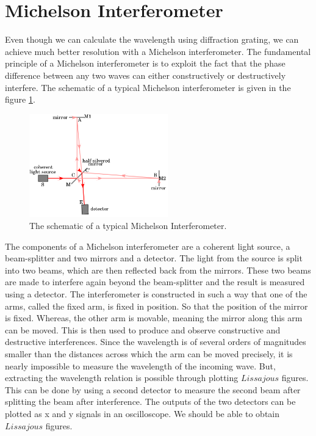 \section{Michelson Interferometer}
Even though we can calculate the wavelength using diffraction grating, we can achieve much better resolution with a Michelson interferometer. The fundamental principle of a Michelson interferometer is to exploit the fact that the phase difference between any two waves can either constructively or destructively interfere. The schematic of a typical Michelson interferometer is given in the figure \ref{fig:michelson}.\\
\begin{figure}[h!]
    \centering
    \includegraphics[width = 6cm]{michelson.png}
    \caption{The schematic of a typical Michelson Interferometer\cite{michelson}.}
    \label{fig:michelson}
\end{figure}
The components of a Michelson interferometer are a coherent light source, a beam-splitter and two mirrors and a detector. The light from the source is split into two beams, which are then reflected back from the mirrors. These two beams are made to interfere again beyond the beam-splitter and the result is measured using a detector. The interferometer is constructed in such a way that one of the arms, called the fixed arm, is fixed in position. So that the position of the mirror is fixed. Whereas, the other arm is movable, meaning the mirror along this arm can be moved. This is then used to produce and observe constructive and destructive interferences. Since the wavelength is of several orders of magnitudes smaller than the distances across which the arm can be moved precisely, it is nearly impossible to measure the wavelength of the incoming wave. But, extracting the wavelength relation is possible through plotting $Lissajous$ figures. This can be done by using a second detector to measure the second beam after splitting the beam after interference. The outputs of the two detectors can be plotted as x and y signals in an oscilloscope. We should be able to obtain $Lissajous$ figures.